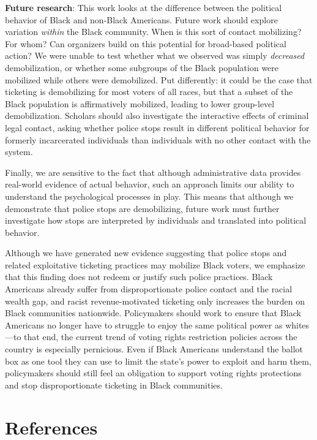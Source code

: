 \documentclass[
  12pt,
]{article}
\begin{document}
\textbf{Future research}: This work looks at the difference between the political behavior of Black and non-Black Americans. Future work should explore variation \emph{within} the Black community. When is this sort of contact mobilizing? For whom? Can organizers build on this potential for broad-based political action? We were unable to test whether what we observed was simply \emph{decreased} demobilization, or whether some subgroups of the Black population were mobilized while others were demobilized. Put differently: it could be the case that ticketing is demobilizing for most voters of all races, but that a subset of the Black population is affirmatively mobilized, leading to lower group-level demobilization. Scholars should also investigate the interactive effects of criminal legal contact, asking whether police stops result in different political behavior for formerly incarcerated individuals than individuals with no other contact with the system.

Finally, we are sensitive to the fact that although administrative data provides real-world evidence of actual behavior, such an approach limits our ability to understand the psychological processes in play. This means that although we demonstrate that police stops are demobilizing, future work must further investigate how stops are interpreted by individuals and translated into political behavior.

Although we have generated new evidence suggesting that police stops and related exploitative ticketing practices may mobilize Black voters, we emphasize that this finding does not redeem or justify such police practices. Black Americans already suffer from disproportionate police contact and the racial wealth gap, and racist revenue-motivated ticketing only increases the burden on Black communities nationwide. Policymakers should work to ensure that Black Americans no longer have to struggle to enjoy the same political power as whites---to that end, the current trend of voting rights restriction policies across the country is especially pernicious. Even if Black Americans understand the ballot box as one tool they can use to limit the state's power to exploit and harm them, policymakers should still feel an obligation to support voting rights protections and stop disproportionate ticketing in Black communities.

\newpage

\hypertarget{references}{%
\section*{References}\label{references}}
\end{document}
